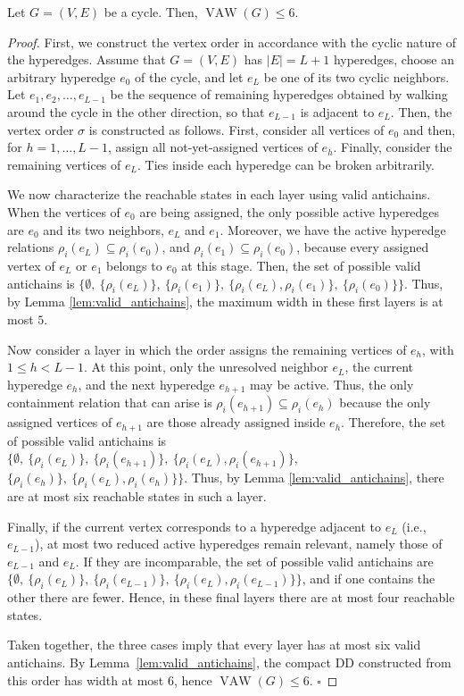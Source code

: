 \begin{proposition}\label{prop:cycle}
Let $G=(V,E)$ be a cycle. Then, $\operatorname{VAW}(G)\le 6$.
\end{proposition}

\begin{proof}
First, we construct the vertex order in accordance with the cyclic nature of the hyperedges.  Assume that $G=(V,E)$ has $|E|= L+1$ hyperedges, choose an arbitrary hyperedge $e_0$ of the cycle, and let $e_L$ be one of its two cyclic neighbors. Let $e_1,e_2,\ldots,e_{L-1}$ be the sequence of remaining hyperedges obtained by walking around the cycle in the other direction, so that $e_{L-1}$ is adjacent to $e_L$. Then, the vertex order $\sigma$ is constructed as follows. First, consider all vertices of $e_0$ and then, for
$h=1,\ldots,L-1$, assign all not-yet-assigned vertices of $e_h$. Finally, consider the remaining vertices of $e_L$. Ties inside each hyperedge can be broken arbitrarily.

We now characterize the reachable states in each layer using valid antichains. When the vertices of $e_0$ are being assigned, the only possible active hyperedges are $e_0$ and its two neighbors, $e_L$ and $e_1$. Moreover, we have the active hyperedge relations $\rho_i(e_L)\subseteq \rho_i(e_0)$, and $\rho_i(e_1)\subseteq \rho_i(e_0)$, because every assigned vertex of $e_L$ or $e_1$ belongs to $e_0$ at this stage.  Then, the set of  possible valid antichains is $\{ 
\emptyset,\ \{\rho_i(e_L)\},\  \{\rho_i(e_1)\},\ \{\rho_i(e_L),\rho_i(e_1)\},\ \{\rho_i(e_0)\} \}$. Thus, by Lemma \ref{lem:valid_antichains}, the maximum width in these first layers is at most $5$.

Now consider a layer in which the order assigns the remaining vertices of $e_h$, with $1\le h<L-1$. At this point, only the unresolved neighbor $e_L$,
the current hyperedge $e_h$, and the next hyperedge $e_{h+1}$ may be active. Thus, the only containment relation that can arise is $\rho_i(e_{h+1})\subseteq \rho_i(e_h)$ because the only assigned vertices of $e_{h+1}$ are those already assigned inside $e_h$. Therefore, the set of possible valid antichains is $\{\emptyset,\ \{\rho_i(e_L)\},\ \{\rho_i(e_{h+1})\},\ 
\{\rho_i(e_L),\rho_i(e_{h+1})\},$ $\{\rho_i(e_h)\},\ \{\rho_i(e_L),\rho_i(e_h)\} \}$. Thus, by Lemma \ref{lem:valid_antichains}, there are at most six reachable states in such a layer.

Finally, if the current vertex corresponds to a hyperedge adjacent to $e_L$ (i.e., $e_{L-1}$), at most two reduced active hyperedges remain relevant, namely those of $e_{L-1}$
and $e_L$. If they are incomparable, the set of possible valid antichains are $\{\emptyset,\ \{\rho_i(e_L)\},\ \{\rho_i(e_{L-1})\},\ \{\rho_i(e_L),\rho_i(e_{L-1})\} \} $, and if one contains the other there are fewer. Hence, in these final layers there are at most four reachable states.

Taken together, the three cases imply that every layer has at most six valid antichains. By Lemma~\ref{lem:valid_antichains}, the compact DD constructed from this order has width at most $6$, hence $\operatorname{VAW}(G)\le 6$.
\hfill$\square$
\end{proof}

